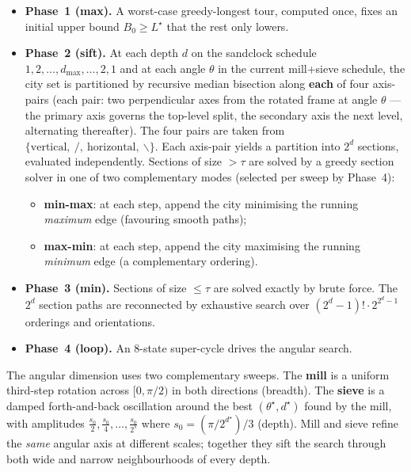 \documentclass[11pt,a4paper]{article}
\begin{document}
\begin{itemize}
\item \textbf{Phase~1 (max).} A worst-case greedy-longest tour, computed
once, fixes an initial upper bound $B_0 \geq L^{\star}$ that the rest only
lowers.

\item \textbf{Phase~2 (sift).} At each depth $d$ on the sandclock
schedule $1, 2, \dots, d_{\max}, \dots, 2, 1$ and at each angle $\theta$
in the current mill+sieve schedule, the city set is partitioned by
recursive median bisection along \textbf{each} of four axis-pairs (each
pair: two perpendicular axes from the rotated frame at angle $\theta$
--- the primary axis governs the top-level split, the secondary axis the
next level, alternating thereafter). The four pairs are taken from
$\{\text{vertical},\ /,\ \text{horizontal},\ \backslash\}$. Each
axis-pair yields a partition into $2^d$ sections, evaluated
independently. Sections of size $> \tau$ are solved by a greedy section
solver in one of two complementary modes (selected per sweep by
Phase~4):
\begin{itemize}
\item \textbf{min-max}: at each step, append the city minimising the
running \emph{maximum} edge (favouring smooth paths);
\item \textbf{max-min}: at each step, append the city maximising the
running \emph{minimum} edge (a complementary ordering).
\end{itemize}

\item \textbf{Phase~3 (min).} Sections of size $\leq \tau$ are solved
exactly by brute force. The $2^d$ section paths are reconnected by
exhaustive search over $(2^d - 1)! \cdot 2^{2^d - 1}$ orderings and
orientations.

\item \textbf{Phase~4 (loop).} An 8-state super-cycle drives the angular
search.
\end{itemize}

The angular dimension uses two complementary sweeps. The \textbf{mill}
is a uniform third-step rotation across $[0, \pi/2)$ in both directions
(breadth). The \textbf{sieve} is a damped forth-and-back oscillation
around the best $(\theta^{\star}, d^{\star})$ found by the mill, with
amplitudes $\tfrac{s_0}{2}, \tfrac{s_0}{4}, \dots, \tfrac{s_0}{2^{s}}$
where $s_0 = (\pi / 2^{d^{\star}}) / 3$ (depth). Mill and sieve refine
the \emph{same} angular axis at different scales; together they sift
the search through both wide and narrow neighbourhoods of every depth.
\end{document}
